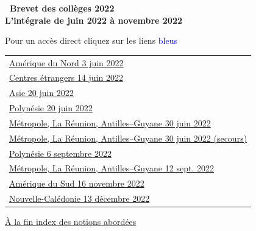 \documentclass[11pt]{article}
\begin{document}
%
\setlength\parindent{0mm}

\pagestyle{fancy}
\thispagestyle{empty}
\begin{center} {\huge \textbf{\decofourleft~Brevet des collèges 2022~\decofourright\\\vspace{1cm} L'intégrale de juin 2022 à novembre 2022}}

\vspace{1cm}

Pour un accès direct cliquez sur les liens {\Large \textcolor{blue}{bleus}}
\end{center}

\begin{tabularx}{\linewidth}{>{\Large}X}

\hyperlink{AmeriqueduNord}{Amérique du Nord 3 juin 2022}\dotfill\pageref{AmeriqueduNord}\\
\hyperlink{Etranger}{Centres étrangers  14 juin 2022} \dotfill \pageref{Etranger}\\
\hyperlink{Asie}{Asie 20 juin  2022} \dotfill \pageref{Asie} \\
\hyperlink{Polynesie}{Polynésie 20 juin 2022} \dotfill \pageref{Polynesie}\\
\hyperlink{Metropole}{Métropole, La Réunion, Antilles--Guyane 30 juin 2022} \dotfill \pageref{Metropole}\\
\hyperlink{Metropole_secours}{Métropole, La Réunion, Antilles--Guyane 30 juin 2022 (secours)} \dotfill \pageref{Metropole_secours}\\
\hyperlink{Polynesiesep}{Polynésie 6 septembre 2022} \dotfill \pageref{Polynesiesep} \\
\hyperlink{Metropolesep}{Métropole, La Réunion, Antilles--Guyane 12 sept. 2022}\dotfill \pageref{Metropolesep}\\
\hyperlink{AmeriqueSud}{Amérique du Sud 16 novembre 2022}\dotfill \pageref{AmeriqueSud} \\
\hyperlink{Caledoniedec}{Nouvelle-Calédonie 13 décembre 2022} \dotfill \pageref{Caledoniedec}
\end{tabularx}

\vspace{1cm}

\hyperlink{Index}{À la fin index des notions abordées}
\newpage
~
\newpage
\hypertarget{AmeriqueduNord}{}

\label{AmeriqueduNord}
\end{document}
